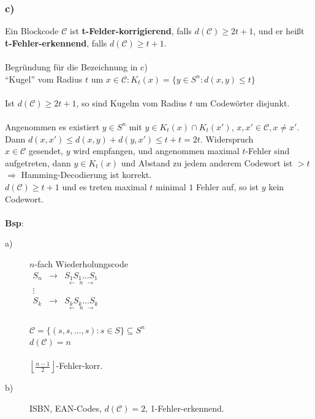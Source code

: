 \subsubsection{c)} 
Ein Blockcode $\mathcal{C}$ ist \textbf{t-Felder-korrigierend}, falls $d(\mathcal{C}) \geq 2t+1$, und er hei\ss t \textbf{t-Fehler-erkennend}, falls $d(\mathcal{C}) \geq t+1$. \\
\\
Begr\"undung f\"ur die Bezeichnung in c) \\
"`Kugel"' vom Radius $t$ um $x \in \mathcal{C}: K_t(x) = \{y \in S^n: d(x,y) \leq t\}$\\
\\
Ist $d(\mathcal{C}) \geq 2t+1$, so sind Kugelm vom Radius $t$ um Codew\"orter disjunkt. \\
\\
Angenommen es existiert $y \in S^n$ mit $y \in K_t(x)\cap K_t(x')$, $x,x' \in \mathcal{C}, x \neq x'$. Dann $d(x,x') \leq d(x,y)+d(y,x') \leq t+t = 2t$. Widerspruch\\ %
$x \in \mathcal{C}$ gesendet, $y$ wird empfangen, und angenommen maximal $t$-Fehler sind aufgetreten, dann $y \in K_t(x)$ und Abstand zu jedem anderem Codewort ist $> t$\\
$\Rightarrow$ Hamming-Decodierung ist korrekt.\\
$d(\mathcal{C}) \geq t+1$ und es treten maximal $t$ minimal $1$ Fehler auf, so ist $y$ kein Codewort.\\
\\
\textbf{Bsp}: 
\begin{description}
	\item[a)] $n$-fach Wiederholungscode \\
	$
	\begin{matrix} 
		S_n & \rightarrow & \underset{\longleftarrow \ \ n \ \ \longrightarrow}{S_1 S_1 \ldots S_1} \\ 
		\vdots \\
		S_k & \rightarrow & \underset{\longleftarrow \ \ n \ \ \longrightarrow}{S_k S_k \ldots S_k}
	\end{matrix}$\\
	\\
	$\mathcal{C}=\lbrace (s,s,\ldots,s): s \in S \rbrace \subseteq S^n$ \\
	$d(\mathcal{C})=n$ \\
	\\
	$\left\lfloor \frac{n-1}{2} \right\rfloor$-Fehler-korr.
	\item[b)] ISBN, EAN-Codes, $d(\mathcal{C})=2$, 1-Fehler-erkennend.
\end{description}

